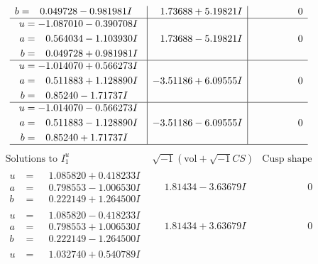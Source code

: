 \documentclass[1p]{elsarticle_modified}
\theoremstyle{definition}
\newcommand{\I}{\sqrt{-1}}
\begin{document}
$$\begin{array}{c|c|c}
\begin{aligned}
b &= \phantom{-}0.049728 - 0.981981 I\end{aligned}
 & \phantom{-}1.73688 + 5.19821 I & \phantom{-0.000000 } 0 \\ \hline\begin{aligned}
u &= -1.087010 - 0.390708 I \\
a &= \phantom{-}0.564034 - 1.103930 I \\
b &= \phantom{-}0.049728 + 0.981981 I\end{aligned}
 & \phantom{-}1.73688 - 5.19821 I & \phantom{-0.000000 } 0 \\ \hline\begin{aligned}
u &= -1.014070 + 0.566273 I \\
a &= \phantom{-}0.511883 + 1.128890 I \\
b &= \phantom{-}0.85240 - 1.71737 I\end{aligned}
 & -3.51186 + 6.09555 I & \phantom{-0.000000 } 0 \\ \hline\begin{aligned}
u &= -1.014070 - 0.566273 I \\
a &= \phantom{-}0.511883 - 1.128890 I \\
b &= \phantom{-}0.85240 + 1.71737 I\end{aligned}
 & -3.51186 - 6.09555 I & \phantom{-0.000000 } 0\\
 \hline 
 \end{array}$$\newpage$$\begin{array}{c|c|c}  
\text{Solutions to }I^u_{1}& \I (\text{vol} + \sqrt{-1}CS) & \text{Cusp shape}\\
 \hline 
\begin{aligned}
u &= \phantom{-}1.085820 + 0.418233 I \\
a &= \phantom{-}0.798553 - 1.006530 I \\
b &= \phantom{-}0.222149 + 1.264500 I\end{aligned}
 & \phantom{-}1.81434 - 3.63679 I & \phantom{-0.000000 } 0 \\ \hline\begin{aligned}
u &= \phantom{-}1.085820 - 0.418233 I \\
a &= \phantom{-}0.798553 + 1.006530 I \\
b &= \phantom{-}0.222149 - 1.264500 I\end{aligned}
 & \phantom{-}1.81434 + 3.63679 I & \phantom{-0.000000 } 0 \\ \hline\begin{aligned}
u &= \phantom{-}1.032740 + 0.540789 I \\

\end{aligned}
\end{array}$$
\end{document}
